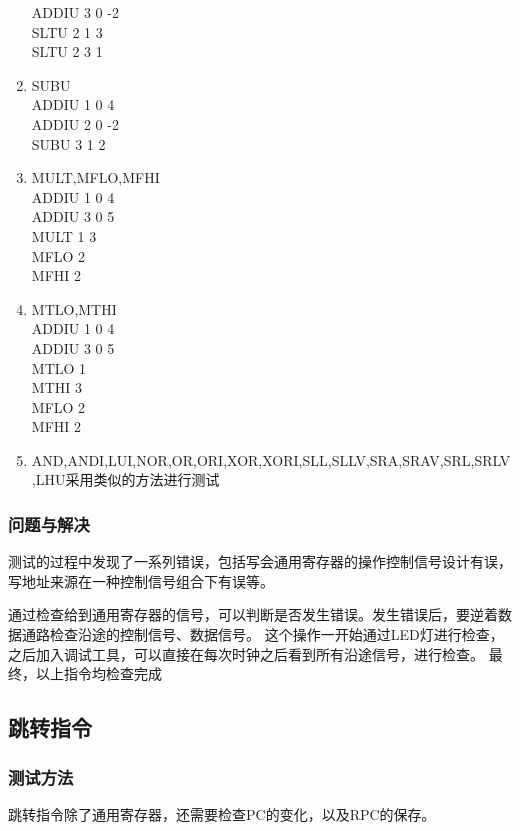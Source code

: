 \begin{enumerate}
                ADDIU 3 0 -2 \\
                SLTU 2 1 3 \\
                SLTU 2 3 1 \\
            \item
                SUBU \\
                ADDIU 1 0 4 \\
                ADDIU 2 0 -2 \\
                SUBU 3 1 2
            \item
                MULT,MFLO,MFHI\\
                ADDIU 1 0 4 \\
                ADDIU 3 0 5 \\
                MULT 1 3 \\
                MFLO 2 \\
                MFHI 2
            \item
                MTLO,MTHI \\
                ADDIU 1 0 4 \\
                ADDIU 3 0 5 \\
                MTLO 1 \\
                MTHI 3 \\
                MFLO 2 \\
                MFHI 2
            \item
                AND,ANDI,LUI,NOR,OR,ORI,XOR,XORI,SLL,SLLV,SRA,SRAV,SRL,SRLV,LHU采用类似的方法进行测试
            \end{enumerate}


        \subsubsection{问题与解决}
        测试的过程中发现了一系列错误，包括写会通用寄存器的操作控制信号设计有误，写地址来源在一种控制信号组合下有误等。

        通过检查给到通用寄存器的信号，可以判断是否发生错误。发生错误后，要逆着数据通路检查沿途的控制信号、数据信号。%
        这个操作一开始通过LED灯进行检查，之后加入调试工具，可以直接在每次时钟之后看到所有沿途信号，进行检查。
        最终，以上指令均检查完成

    \subsection{跳转指令}
        \subsubsection{测试方法}
        跳转指令除了通用寄存器，还需要检查PC的变化，以及RPC的保存。

